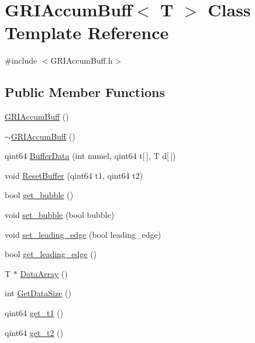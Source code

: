 \hypertarget{classGRIAccumBuff}{\section{\-G\-R\-I\-Accum\-Buff$<$ \-T $>$ \-Class \-Template \-Reference}
\label{classGRIAccumBuff}
}


{\ttfamily \#include $<$\-G\-R\-I\-Accum\-Buff.\-h$>$}

\subsection*{\-Public \-Member \-Functions}
\begin{DoxyCompactItemize}
\item 
\hyperlink{classGRIAccumBuff_adba44edcec702b4910818a34e1b73961}{\-G\-R\-I\-Accum\-Buff} ()
\item 
\hyperlink{classGRIAccumBuff_a749fb3c5737d1ee33d02595fb11d1b24}{$\sim$\-G\-R\-I\-Accum\-Buff} ()
\item 
qint64 \hyperlink{classGRIAccumBuff_a08df4fe23a7f605ca167c1c6d13b5115}{\-Buffer\-Data} (int numel, qint64 t\mbox{[}$\,$\mbox{]}, \-T d\mbox{[}$\,$\mbox{]})
\item 
void \hyperlink{classGRIAccumBuff_a64511803162d0227c899cec6753333d2}{\-Reset\-Buffer} (qint64 t1, qint64 t2)
\item 
bool \hyperlink{classGRIAccumBuff_af25890074841d4bc044f23f056d3b390}{get\-\_\-bubble} ()
\item 
void \hyperlink{classGRIAccumBuff_a5e128cedaec6c428a4ab688a02ef39b4}{set\-\_\-bubble} (bool bubble)
\item 
void \hyperlink{classGRIAccumBuff_a21524f7dc51a41a181a49241d7704396}{set\-\_\-leading\-\_\-edge} (bool leading\-\_\-edge)
\item 
bool \hyperlink{classGRIAccumBuff_a51610a0878b69c94f278c48382ad827a}{get\-\_\-leading\-\_\-edge} ()
\item 
\-T $\ast$ \hyperlink{classGRIAccumBuff_a76963f27bd79481daeef45cddb140e58}{\-Data\-Array} ()
\item 
int \hyperlink{classGRIAccumBuff_afd8841b3228f1b7c84e030d7a0983d86}{\-Get\-Data\-Size} ()
\item 
qint64 \hyperlink{classGRIAccumBuff_a1eca3d5d5dc180fac8b3c8bcc394d109}{get\-\_\-t1} ()
\item 
qint64 \hyperlink{classGRIAccumBuff_a4562576e56c461ed5ec8ef8fcf186330}{get\-\_\-t2} ()
\end{DoxyCompactItemize}
